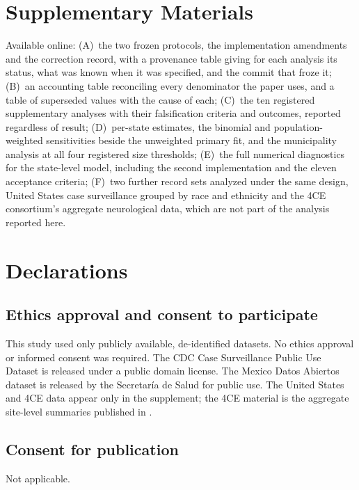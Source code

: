 \documentclass[11pt]{article}
\begin{document}
\section{Supplementary Materials}
\label{app:supplementary}

Available online:
(A)~the two frozen protocols, the implementation amendments and the
correction record, with a provenance table giving for each analysis its
status, what was known when it was specified, and the commit that froze
it;
(B)~an accounting table reconciling every denominator the paper uses,
and a table of superseded values with the cause of each;
(C)~the ten registered supplementary analyses with their falsification
criteria and outcomes, reported regardless of result;
(D)~per-state estimates, the binomial and population-weighted
sensitivities beside the unweighted primary fit, and the municipality
analysis at all four registered size thresholds;
(E)~the full numerical diagnostics for the state-level model, including
the second implementation and the eleven acceptance criteria;
(F)~two further record sets analyzed under the same design, United
States case surveillance grouped by race and ethnicity and the 4CE
consortium's aggregate neurological data, which are not part of the
analysis reported here.

\section*{Declarations}

\subsection*{Ethics approval and consent to participate}
This study used only publicly available, de-identified datasets.  No
ethics approval or informed consent was required.  The CDC Case
Surveillance Public Use Dataset is released under a public domain license.
The Mexico Datos Abiertos dataset is released by the Secretar\'{i}a de
Salud for public use.  The United States and 4CE data appear only in the
supplement; the 4CE material is the aggregate site-level summaries
published in \cite{four_ce_neuro2021}.

\subsection*{Consent for publication}
Not applicable.
\end{document}
